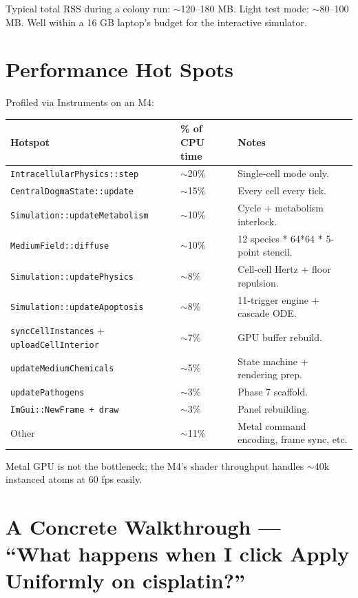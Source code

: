 \documentclass[11pt,letterpaper,twoside,openany]{book}
\newcommand{\code}[1]{\texttt{#1}}
\begin{document}
Typical total RSS during a colony run: $\sim$120--180 MB. Light
test mode: $\sim$80--100 MB. Well within a 16 GB laptop's
budget for the interactive simulator.

\chapter{Performance Hot Spots}
\label{ch:hotspots}

Profiled via Instruments on an M4:

\begin{longtable}{p{6.5cm}p{3.0cm}p{5.0cm}}
\toprule
\textbf{Hotspot} & \textbf{\% of CPU time} & \textbf{Notes}\\ \midrule
\code{IntracellularPhysics::step} & $\sim$20\% & Single-cell mode only.\\
\code{CentralDogmaState::update}  & $\sim$15\% & Every cell every tick.\\
\code{Simulation::updateMetabolism} & $\sim$10\% & Cycle + metabolism interlock.\\
\code{MediumField::diffuse}       & $\sim$10\% & 12 species * 64*64 * 5-point stencil.\\
\code{Simulation::updatePhysics}  & $\sim$8\%  & Cell-cell Hertz + floor repulsion.\\
\code{Simulation::updateApoptosis}& $\sim$8\%  & 11-trigger engine + cascade ODE.\\
\code{syncCellInstances} + \code{uploadCellInterior} & $\sim$7\% & GPU buffer rebuild.\\
\code{updateMediumChemicals}      & $\sim$5\% & State machine + rendering prep.\\
\code{updatePathogens}            & $\sim$3\% & Phase 7 scaffold.\\
\code{ImGui::NewFrame + draw}     & $\sim$3\% & Panel rebuilding.\\
Other                              & $\sim$11\% & Metal command encoding, frame sync, etc.\\
\bottomrule
\end{longtable}

Metal GPU is not the bottleneck; the M4's shader throughput handles
$\sim$40k instanced atoms at 60 fps easily.

\chapter{A Concrete Walkthrough --- ``What happens when I click Apply Uniformly on cisplatin?''}
\label{ch:walkthrough-drug}
\end{document}
